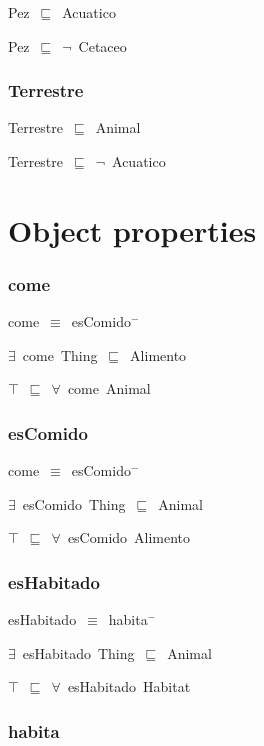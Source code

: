 Pez~\ensuremath{\sqsubseteq}~Acuatico~

Pez~\ensuremath{\sqsubseteq}~\ensuremath{\lnot}~Cetaceo

\subsubsection*{Terrestre}

Terrestre~\ensuremath{\sqsubseteq}~Animal~

Terrestre~\ensuremath{\sqsubseteq}~\ensuremath{\lnot}~Acuatico

\section*{Object properties}\subsubsection*{come}

come~\ensuremath{\equiv}~esComido\ensuremath{^-}

\ensuremath{\exists}~come~Thing~\ensuremath{\sqsubseteq}~Alimento

\ensuremath{\top}~\ensuremath{\sqsubseteq}~\ensuremath{\forall}~come~Animal

\subsubsection*{esComido}

come~\ensuremath{\equiv}~esComido\ensuremath{^-}

\ensuremath{\exists}~esComido~Thing~\ensuremath{\sqsubseteq}~Animal

\ensuremath{\top}~\ensuremath{\sqsubseteq}~\ensuremath{\forall}~esComido~Alimento

\subsubsection*{esHabitado}

esHabitado~\ensuremath{\equiv}~habita\ensuremath{^-}

\ensuremath{\exists}~esHabitado~Thing~\ensuremath{\sqsubseteq}~Animal

\ensuremath{\top}~\ensuremath{\sqsubseteq}~\ensuremath{\forall}~esHabitado~Habitat

\subsubsection*{habita}

